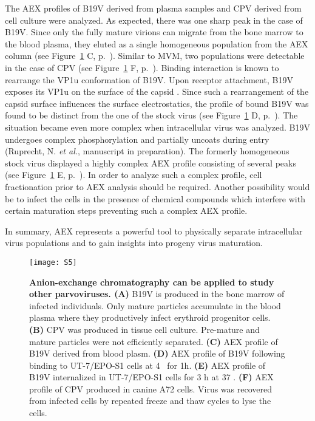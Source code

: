 The AEX profiles of B19V derived from plasma samples and CPV derived from cell culture were analyzed. As expected, there was one sharp peak in the case of B19V. Since only the fully mature virions can migrate from the bone marrow to the blood plasma, they eluted as a single homogeneous population from the AEX column (see Figure~\ref{S5} C, p.~\pageref{S5}). Similar to MVM, two populations were detectable in the case of CPV (see Figure~\ref{S5} F, p.~\pageref{S5}). Binding interaction is known to rearrange the VP1u conformation of B19V. Upon receptor attachment, B19V exposes its VP1u on the surface of the capsid \cite{pmid20826697}. Since such a rearrangement of the capsid surface influences the surface electrostatics, the profile of bound B19V was found to be distinct from the one of the stock virus (see Figure~\ref{S5} D, p.~\pageref{S5}). The situation became even more complex when intracellular virus was analyzed. B19V undergoes complex phosphorylation and partially uncoats during entry (Ruprecht, N. \textit{et al.}, manuscript in preparation). The formerly homogeneous stock virus displayed a highly complex AEX profile consisting of several peaks (see Figure~\ref{S5} E, p.~\pageref{S5}). In order to analyze such a complex profile, cell fractionation prior to AEX analysis should be required. Another possibility would be to infect the cells in the presence of chemical compounds which interfere with certain maturation steps preventing such a complex AEX profile. 

In summary, AEX represents a powerful tool to physically separate intracellular virus populations and to gain insights into progeny virus maturation.         
 






\begin{figure}
\centering
  \texttt{[image: S5]} \\[-0.2cm]
  \caption[Anion-Exchange Chromatography Performed with B19V]
   {\textbf{Anion-exchange chromatography can be applied to study other parvoviruses. (A)} B19V is produced in the bone marrow of infected individuals. Only mature particles accumulate in the blood plasma where they productively infect erythroid progenitor cells. \textbf{(B)} CPV was produced in tissue cell culture. Pre-mature and mature particles were not efficiently separated. \textbf{(C)} AEX profile of B19V derived from blood plasm. \textbf{(D)} AEX profile of B19V following binding to UT-7/EPO-S1 cells at 4 \textcelsius~for 1h. \textbf{(E)} AEX profile of B19V internalized in UT-7/EPO-S1 cells for 3 h at 37 \textcelsius.  \textbf{(F)} AEX profile of CPV produced in canine A72 cells. Virus was recovered from infected cells by repeated freeze and thaw cycles to lyse the cells.} 
\label{S5}
\end{figure}





    




\renewcommand\thefigure{\thechapter.\arabic{figure}} 

